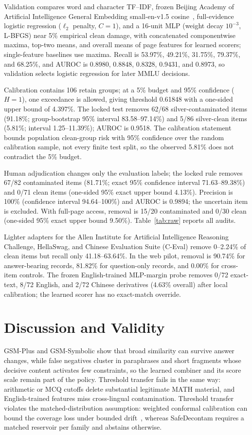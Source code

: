 \documentclass[conference]{IEEEtran}
\begin{document}
Validation compares word and character TF--IDF, frozen Beijing Academy of Artificial Intelligence General Embedding small-en-v1.5 cosine~\cite{xiao2024}, full-evidence logistic regression ($\ell_2$ penalty, $C=1$), and a 16-unit MLP (weight decay $10^{-3}$, L-BFGS) near 5\% empirical clean damage, with concatenated componentwise maxima, top-two means, and overall means of page features for learned scorers; single-feature baselines use maxima. Recall is 53.97\%, 49.21\%, 31.75\%, 79.37\%, and 68.25\%, and AUROC is 0.8980, 0.8848, 0.8328, 0.9431, and 0.8973, so validation selects logistic regression for later MMLU decisions.

Calibration contains 106 retain groups; at a 5\% budget and 95\% confidence ($H=1$), one exceedance is allowed, giving threshold 0.61848 with a one-sided upper bound of 4.397\%. The locked test removes 62/68 silver-contaminated items (91.18\%; group-bootstrap 95\% interval 83.58--97.14\%) and 5/86 silver-clean items (5.81\%; interval 1.25--11.39\%); AUROC is 0.9518. The calibration statement bounds population clean-group risk with 95\% confidence over the random calibration sample, not every finite test split, so the observed 5.81\% does not contradict the 5\% budget.

Human adjudication changes only the evaluation labels; the locked rule removes 67/82 contaminated items (81.71\%; exact 95\% confidence interval 71.63--89.38\%) and 0/71 clean items (one-sided 95\% exact upper bound 4.13\%). Precision is 100\% (confidence interval 94.64--100\%) and AUROC is 0.9894; the uncertain item is excluded. With full-page access, removal is 15/20 contaminated and 0/30 clean (one-sided 95\% exact upper bound 9.50\%). Table~\ref{tab:raw} reports all audits.

Lighter adapters for the Allen Institute for Artificial Intelligence Reasoning Challenge, HellaSwag, and Chinese Evaluation Suite (C-Eval) remove 0--2.24\% of clean items but recall only 41.18--63.64\%. In the web pilot, removal is 90.74\% for answer-bearing records, 81.82\% for question-only records, and 0.00\% for cross-item controls. The frozen English-trained MLP-margin probe removes 0/72 exact-text, 8/72 English, and 2/72 Chinese derivatives (4.63\% overall) after local calibration; the learned scorer has no exact-match override.

\section{Discussion and Validity}
GSM-Plus and GSM-Symbolic show that broad similarity can survive answer changes, while false negatives cluster in paraphrases and short fragments whose decisive content activates few constraints, so the learned combiner and its score scale remain part of the policy. Threshold transfer fails in the same way: arithmetic or MCQ cutoffs delete substantial legitimate MATH material, and English-trained features miss cross-lingual contamination. Threshold transfer violates the matched-distribution assumption: weighted conformal calibration can bound the coverage loss under bounded drift~\cite{barber2023}, whereas SafeDecontam requires a matched reservoir per family and abstains otherwise.
\end{document}
